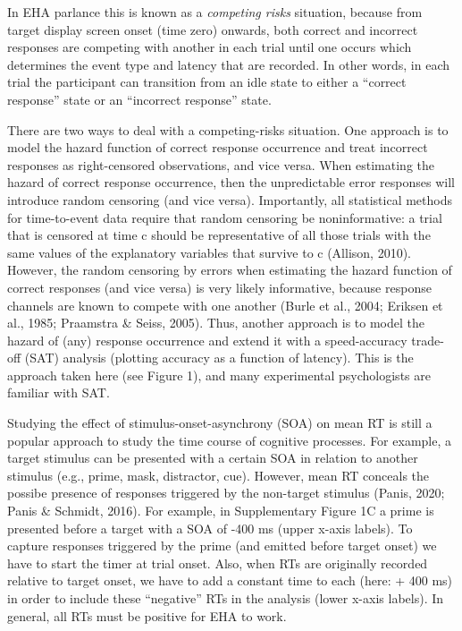 \documentclass[
  man,floatsintext]{apa6}
\begin{document}
In EHA parlance this is known as a \emph{competing risks} situation, because from target display screen onset (time zero) onwards, both correct and incorrect responses are competing with another in each trial until one occurs which determines the event type and latency that are recorded. In other words, in each trial the participant can transition from an idle state to either a ``correct response'' state or an ``incorrect response'' state.

There are two ways to deal with a competing-risks situation. One approach is to model the hazard function of correct response occurrence and treat incorrect responses as right-censored observations, and vice versa. When estimating the hazard of correct response occurrence, then the unpredictable error responses will introduce random censoring (and vice versa). Importantly, all statistical methods for time-to-event data require that random censoring be noninformative: a trial that is censored at time c should be representative of all those trials with the same values of the explanatory variables that survive to c (Allison, 2010). However, the random censoring by errors when estimating the hazard function of correct responses (and vice versa) is very likely informative, because response channels are known to compete with one another (Burle et al., 2004; Eriksen et al., 1985; Praamstra \& Seiss, 2005). Thus, another approach is to model the hazard of (any) response occurrence and extend it with a speed-accuracy trade-off (SAT) analysis (plotting accuracy as a function of latency). This is the approach taken here (see Figure 1), and many experimental psychologists are familiar with SAT.

Studying the effect of stimulus-onset-asynchrony (SOA) on mean RT is still a popular approach to study the time course of cognitive processes. For example, a target stimulus can be presented with a certain SOA in relation to another stimulus (e.g., prime, mask, distractor, cue). However, mean RT conceals the possibe presence of responses triggered by the non-target stimulus (Panis, 2020; Panis \& Schmidt, 2016). For example, in Supplementary Figure 1C a prime is presented before a target with a SOA of -400 ms (upper x-axis labels). To capture responses triggered by the prime (and emitted before target onset) we have to start the timer at trial onset. Also, when RTs are originally recorded relative to target onset, we have to add a constant time to each (here: + 400 ms) in order to include these ``negative'' RTs in the analysis (lower x-axis labels). In general, all RTs must be positive for EHA to work.
\end{document}
